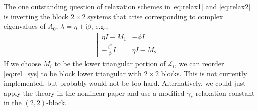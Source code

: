 \documentclass[a4paper,10pt]{article}
\begin{document}
The one outstanding question of relaxation schemes in \eqref{eq:relax1} and
\eqref{eq:relax2} is inverting the block $2\times 2$ systems that arise
corresponding to complex eigenvalues of $A_0$, $\lambda = \eta \pm \mathrm{i}\beta$,
e.g.,
%
\begin{align}\label{eq:rel_sys}
\begin{bmatrix} \eta I - M_1 & -\phi I \\ -\frac{\beta^2}{\phi}I & \eta I - M_2 \end{bmatrix}
\end{align}
%
If we choose $M_i$ to be the lower triangular portion of $\mathcal{L}_i$, we
can reorder \eqref{eq:rel_sys} to be block lower triangular with $2\times 2$
blocks. This is not currently implemented, but probably would not be too hard.
Alternatively, we could just apply the theory in the nonlinear paper and use
a modified $\gamma_*$ relaxation constant in the $(2,2)$-block.
\end{document}
